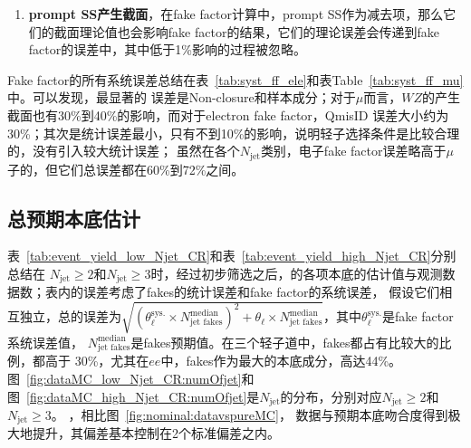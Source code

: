 \begin{enumerate}
  \item \textbf{prompt SS产生截面}，在fake factor计算中，prompt SS作为减去项，那么它们的截面理论值也会影响fake
factor的结果，它们的理论误差会传递到fake factor的误差中，其中低于1\%影响的过程被忽略。
\end{enumerate}
  Fake factor的所有系统误差总结在表~\ref{tab:syst_ff_ele}和表Table~\ref{tab:syst_ff_mu}中。可以发现，最显著的
误差是Non-closure和样本成分；对于$\mu$而言，$WZ$的产生截面也有30\%到40\%的影响，而对于electron fake factor，QmisID
误差大小约为30\%；其次是统计误差最小，只有不到10\%的影响，说明轻子选择条件是比较合理的，没有引入较大统计误差；
虽然在各个$N_{\text{jet}}$类别，电子fake factor误差略高于$\mu$子的，但它们总误差都在60\%到72\%之间。


\subsection{总预期本底估计}
表~\ref{tab:event_yield_low_Njet_CR}和表~\ref{tab:event_yield_high_Njet_CR}分别总结在
$N_{\text{jet}}\geq2$和$N_{\text{jet}}\geq3$时，经过初步筛选之后，的各项本底的估计值与观测数据数；表内的误差考虑了fakes的统计误差和fake factor的系统误差，
假设它们相互独立，总的误差为$\sqrt{({\theta_{\ell}^{\text{sys.}}\times N^{\text{median}}_{\text{jet fakes}}})^2+\theta_{\ell}\times N^{\text{median}}_{\text{jet fakes}}}$，其中$\theta_{\ell}^{\text{sys.}}$是fake factor系统误差值，
$N^{\text{median}}_{\text{jet fakes}}$是fakes预期值。在三个轻子道中，fakes都占有比较大的比例，都高于
30\%，尤其在$ee$中，fakes作为最大的本底成分，高达44\%。
图~\ref{fig:dataMC_low_Njet_CR:numOfjet}和图~\ref{fig:dataMC_high_Njet_CR:numOfjet}是$N_{\text{jet}}$的分布，分别对应$N_{\text{jet}}\geq2$和$N_{\text{jet}}\geq3$。
，相比图~\ref{fig:nominal:datavspureMC}，
数据与预期本底吻合度得到极大地提升，其偏差基本控制在2个标准偏差之内。

